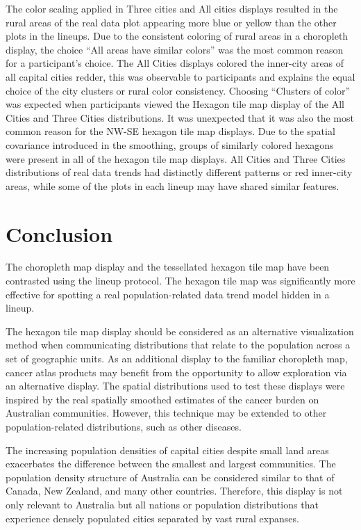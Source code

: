\documentclass[journal]{vgtc}                     %
\begin{document}
The color scaling applied in Three cities and All cities displays resulted in the rural areas of the real data plot appearing more blue or yellow than the other plots in the lineups.
Due to the consistent coloring of rural areas in a choropleth display, the choice ``All areas have similar colors'' was the most common reason for a participant's choice. The All Cities displays colored the inner-city areas of all capital cities redder, this was observable to participants and explains the equal choice of the city clusters or rural color consistency.
Choosing ``Clusters of color'' was expected when participants viewed the Hexagon tile map display of the All Cities and Three Cities distributions. It was unexpected that it was also the most common reason for the NW-SE hexagon tile map displays.
Due to the spatial covariance introduced in the smoothing, groups of similarly colored hexagons were present in all of the hexagon tile map displays. All Cities and Three Cities distributions of real data trends had distinctly different patterns or red inner-city areas, while some of the plots in each lineup may have shared similar features.

\hypertarget{conclusion}{%
\section{Conclusion}\label{conclusion}}

The choropleth map display and the tessellated hexagon tile map have been contrasted using the lineup protocol. The hexagon tile map was significantly more effective for spotting a real population-related data trend model hidden in a lineup.

The hexagon tile map display should be considered as an alternative visualization method when communicating distributions that relate to the population across a set of geographic units. As an additional display to the familiar choropleth map, cancer atlas products may benefit from the opportunity to allow exploration via an alternative display. The spatial distributions used to test these displays were inspired by the real spatially smoothed estimates of the cancer burden on Australian communities. However, this technique may be extended to other population-related distributions, such as other diseases.

The increasing population densities of capital cities despite small land areas exacerbates the difference between the smallest and largest communities.
The population density structure of Australia can be considered similar to that of Canada, New Zealand, and many other countries. Therefore, this display is not only relevant to Australia but all nations or population distributions that experience densely populated cities separated by vast rural expanses.
\end{document}
